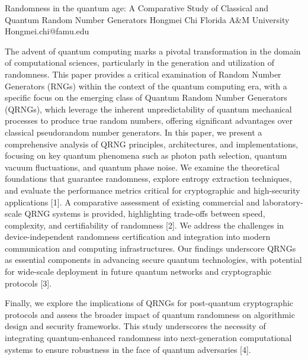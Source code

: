 \begin{talk}
  {Randomness in the quantum age: A Comparative Study of Classical and Quantum Random Number Generators}%
  {Hongmei Chi}%
  {Florida A\&M University}%
  {Hongmei.chi@famu.edu}%
 
     
The advent of quantum computing marks a pivotal transformation in the domain of computational sciences, particularly in the generation and utilization of randomness. This paper provides a critical examination of Random Number Generators (RNGs) within the context of the quantum computing era, with a specific focus on the emerging class of Quantum Random Number Generators (QRNGs), which leverage the inherent unpredictability of quantum mechanical processes to produce true random numbers, offering significant advantages over classical pseudorandom number generators. 
In this paper, we present a comprehensive analysis of QRNG principles, architectures, and implementations, focusing on key quantum phenomena such as photon path selection, quantum vacuum fluctuations, and quantum phase noise. We examine the theoretical foundations that guarantee randomness, explore entropy extraction techniques, and evaluate the performance metrics critical for cryptographic and high-security applications [1]. A comparative assessment of existing commercial and laboratory-scale QRNG systems is provided, highlighting trade-offs between speed, complexity, and certifiability of randomness [2].  We address the challenges in device-independent randomness certification and integration into modern communication and computing infrastructures. Our findings underscore QRNGs as essential components in advancing secure quantum technologies, with potential for wide-scale deployment in future quantum networks and cryptographic protocols [3].

 Finally, we explore the implications of QRNGs for post-quantum cryptographic protocols and assess the broader impact of quantum randomness on algorithmic design and security frameworks. This study underscores the necessity of integrating quantum-enhanced randomness into next-generation computational systems to ensure robustness in the face of quantum adversaries [4].


\end{talk}
